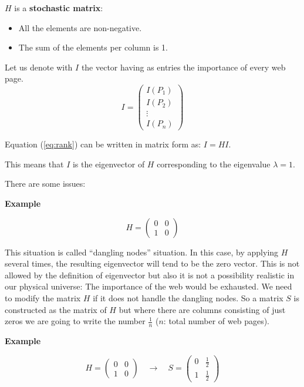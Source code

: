 $H$ is a \textbf{stochastic matrix}:
\begin{itemize}
\item All the elements are non-negative.
\item The sum of the elements per column is 1.
\end{itemize}

Let us denote with $I$ the vector having as entries the importance of every web page.
\[
I = 
\begin{pmatrix}
I(P_1) \\
I(P_2) \\
\vdots \\
I(P_n)
\end{pmatrix}
\]

Equation (\ref{eq:rank}) can be written in matrix form as: $I = HI$.

This means that $I$ is the eigenvector of $H$ corresponding to the eigenvalue $\lambda = 1$.

There are some issues:

\textbf{Example}
\begin{center}
\end{center}

\[
H = 
\begin{pmatrix}
0 & 0 \\
1 & 0
\end{pmatrix}
\]

This situation is called ``dangling nodes'' situation. In this case, by applying $H$ several
times, the resulting eigenvector will tend to be the zero vector.
This is not allowed by the definition of eigenvector but also it is not a possibility realistic
in our physical universe: The importance of the web would be exhausted.
We need to modify the matrix $H$ if it does not handle the dangling nodes.
So a matrix $S$ is constructed as the matrix of $H$ but where there are columns consisting of
just zeros we are going to write the number $\frac{1}{n}$ ($n$: total number of web pages).

\textbf{Example}

\[
H = 
\begin{pmatrix}
0 & 0 \\
1 & 0
\end{pmatrix}
\quad \rightarrow \quad
S = 
\begin{pmatrix}
0 & \frac{1}{2} \\
1 & \frac{1}{2}
\end{pmatrix}
\]

